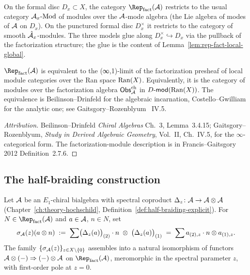 \begin{remark}\label{rem:three-local-models}
On the formal disc $D_x\subset X$, the category
$\Rep_{\mathrm{fact}}(\cA)$ restricts to the usual category
$\mathcal{A}_{x}\text{-}\mathrm{Mod}$ of modules over the $\mathcal{A}$-mode algebra
(the Lie algebra of modes of $\mathcal{A}$ on $D_x$). On the punctured
formal disc $D^\times_x$ it restricts to the category of smooth
$\hat{\mathcal{A}}_{x}$-modules. The three models glue along
$D^\times_x\hookrightarrow D_x$ via the pullback of the factorization
structure; the glue is the content of
Lemma~\ref{lem:rep-fact-local-global}.
\end{remark}

\begin{lemma}\label{lem:rep-fact-local-global}
$\Rep_{\mathrm{fact}}(\cA)$ is equivalent to the (∞,1)-limit
of the factorization presheaf of local module categories over the
Ran space $\mathrm{Ran}(X)$. Equivalently, it is the category of
modules over the factorization algebra $\mathsf{Obs}^{\mathrm{ch}}_{\mathcal{A}}$ in
$D\text{-}\mathsf{mod}(\mathrm{Ran}(X))$. The equivalence is Beilinson--Drinfeld for the
algebraic incarnation, Costello--Gwilliam for the analytic one; see
Gaitsgory--Rozenblyum~\cite{GR17} IV.5.
\end{lemma}

\begin{proof}[Attribution]
Beilinson--Drinfeld \textit{Chiral Algebras} Ch.~3, Lemma~3.4.15;
Gaitsgory--Rozenblyum, \textit{Study in Derived Algebraic Geometry},
Vol.~II, Ch.~IV.5, for the $\infty$-categorical form. The
factorization-module description is in Francis--Gaitsgory 2012
Definition~2.7.6.
\end{proof}

\subsection{The half-braiding construction}\label{subsec:half-braiding}

\begin{definition}\label{def:chiral-half-braiding}%
%
Let $\mathcal{A}$ be an $E_1$-chiral bialgebra with spectral coproduct
$\Delta_z\colon \mathcal{A}\to\mathcal{A}\otimes\mathcal{A}$
(Chapter~\ref{ch:theory-hochschild}, Definition~\ref{def:half-braiding-explicit}).
For $N\in\Rep_{\mathrm{fact}}(\cA)$ and $a\in\mathcal{A}$, $n\in N$, set
\begin{equation}
 \label{eq:chiral-half-braiding}
 \sigma_{\mathcal{A}}(z)(a\otimes n)
 \;:=\;
 \sum\bigl(\Delta_z(a)\bigr)_{(2)}\cdot n
 \;\otimes\;
 \bigl(\Delta_z(a)\bigr)_{(1)}
 \;=\;
 \sum a_{(2),z}\cdot n\otimes a_{(1),z}.
\end{equation}
The family $\{\sigma_{\mathcal{A}}(z)\}_{z\in X\setminus\{0\}}$ assembles into a
natural isomorphism of functors
$\mathcal{A}\otimes(-)\Rightarrow(-)\otimes\mathcal{A}$ on
$\Rep_{\mathrm{fact}}(\cA)$, meromorphic in the spectral parameter $z$,
with first-order pole at $z=0$.
\end{definition}


